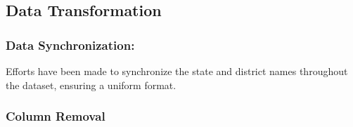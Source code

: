 \documentclass[12pt]{article}
\begin{document}
\subsection{Data Transformation}

\subsubsection{Data Synchronization: } Efforts have been made to synchronize the state and district names throughout the dataset, ensuring a uniform format.
\subsubsection{Column Removal}
\begin{comment}
As part of the data preprocessing, some columns were renamed for clarity and consistency, while irrelevant or redundant features were removed to streamline the dataset for analysis.\\

\vspace{5pt}
To streamline the dataset and focus on relevant variables for the analysis, several columns were removed, including those related to administrative IDs, season names, and insurance company details. This transformation resulted in a reduced set of features that better align with the goals of the project. \\

\vspace{5pt}


\end{comment}
\end{document}

